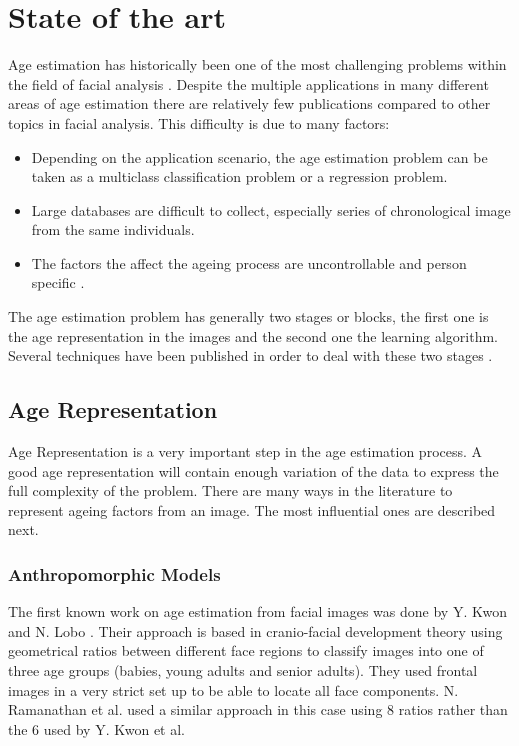 \chapter{State of the art} \label{chap:sota}

Age estimation has historically been one of the most challenging problems within the field of facial analysis \cite{5406526}\cite{han:age}. Despite the multiple applications in many different areas of age estimation there are relatively few publications compared to other topics in facial analysis. This difficulty is due to many factors: 
\begin{itemize}
	\item Depending on the application scenario, the age estimation problem can be taken as a multiclass classification problem or a regression problem.
	\item Large databases are difficult to collect, especially series of chronological image from the same individuals.
	\item The factors the affect the ageing process are uncontrollable and person specific \cite{4284917}\cite{4359348}\cite{1709980}.
\end{itemize}

The age estimation problem has generally two stages or blocks, the first one is the age representation in the images and the second one the learning algorithm. Several techniques have been published in order to deal with these two stages \cite{5406526}.

\section{Age Representation}

Age Representation is a very important step in the age estimation process. A good age representation will contain enough variation of the data to express the full complexity of the problem. There are many ways in the literature to represent ageing factors from an image. The most influential ones are described next.

\subsection{Anthropomorphic Models}
The first known work on age estimation from facial images was done by Y. Kwon and N. Lobo \cite{Kwon:1999:ACF:311844.311845}. Their approach is based in cranio-facial development theory using geometrical ratios between different face regions to classify images into one of three age groups (babies, young adults and senior adults). They used frontal images in a very strict set up to be able to locate all face components. N. Ramanathan et al. \cite{1640784, Ramanathan2009131} used a similar approach in this case using 8 ratios rather than the 6 used by Y. Kwon et al.

